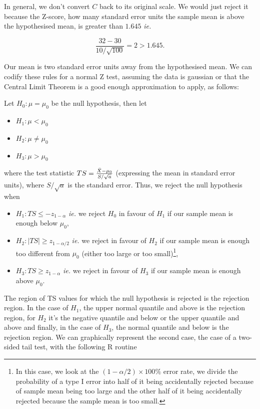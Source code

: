 \documentclass{homework}
\begin{document}
In general, we don't convert $C$ back to its original scale. We would just reject it because the Z-score, how many standard error units the sample mean is above the hypothesised mean, is greater than $1.645$ \textit{ie. }

$$
\frac{32-30}{10/\sqrt{100}} = 2 > 1.645.
$$

Our mean is two standard error units away from the hypothesised mean. We can codify these rules for a normal Z test, assuming the data is gaussian or that the Central Limit Theorem is a good enough approximation to apply, as follows:

\begin{tcolorbox}[title=Rules for a normal Z-test]

Let $H_0 : \mu = \mu_0$ be the null hypothesis, then let 
\begin{itemize}
    \item $H_1: \mu < \mu_0$
    \item $H_2: \mu \neq \mu_0$
    \item $H_3: \mu > \mu_0$
\end{itemize}

where the test statistic $TS = \frac{\Bar{X}-\mu_0}{S/\sqrt{a}}$ (expressing the mean in standard error units), where $S/\sqrt{a}$ is the standard error. Thus, we reject the null hypothesis when 

\begin{itemize}
    \item $H_1: TS \leq -z_{1-\alpha}$ \textit{ie.} we reject $H_0$ in favour of $H_1$ if our sample mean is enough below $\mu_0$,
    \item $H_2: |TS| \geq  z_{1-\alpha/2}$ \textit{ie.} we reject in favour of $H_2$ if our sample mean is enough too different from $\mu_0$ (either too large or too small)\footnote{In this case, we look at the $(1-\alpha/2)\times 100\%$ error rate, we divide the probability of a type I error into half of it being accidentally rejected because of sample mean being too large and the other half of it being accidentally rejected because the sample mean is too small. }, 
    \item $H_3: TS \geq z_{1-\alpha}$ \textit{ie.} we reject in favour of $H_3$ if our sample mean is enough above $\mu_0$.
\end{itemize}
\end{tcolorbox}

The region of TS values for which the null hypothesis is rejected is the rejection region. In the case of $H_1$, the upper normal quantile and above is the rejection region, for $H_2$ it's the negative quantile and below or the upper quantile and above and finally, in the case of $H_3$, the normal quantile and below is the rejection region. We can graphically represent the second case, the case of a two-sided tail test, with the following R routine
\end{document}
